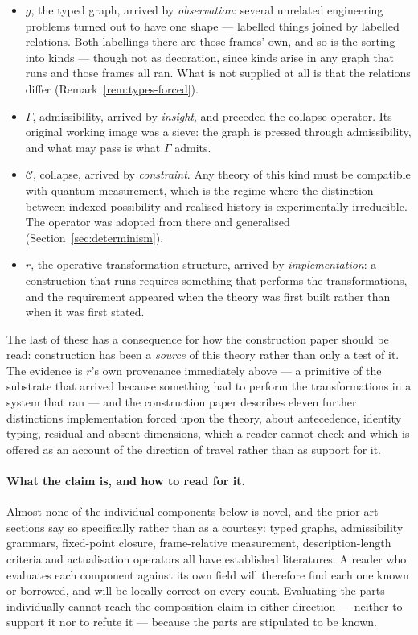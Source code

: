 \documentclass[11pt,a4paper]{article}
\theoremstyle{remark}\newtheorem{remark}[definition]{Remark}
\newcommand{\Coll}{\mathcal{C}}
\begin{document}
\begin{itemize}[leftmargin=*]
\item $g$, the typed graph, arrived by \emph{observation}: several unrelated engineering problems turned out to have one shape --- labelled things joined by labelled relations. Both labellings there are those frames' own, and so is the sorting into kinds --- though not as decoration, since kinds arise in any graph that runs and those frames all ran. What is not supplied at all is that the relations differ (Remark~\ref{rem:types-forced}).
\item $\Gamma$, admissibility, arrived by \emph{insight}, and preceded the collapse operator. Its original working image was a sieve: the graph is pressed through admissibility, and what may pass is what $\Gamma$ admits.
\item $\Coll$, collapse, arrived by \emph{constraint}. Any theory of this kind must be compatible with quantum measurement, which is the regime where the distinction between indexed possibility and realised history is experimentally irreducible. The operator was adopted from there and generalised (Section~\ref{sec:determinism}).
\item $r$, the operative transformation structure, arrived by \emph{implementation}: a construction that runs requires something that performs the transformations, and the requirement appeared when the theory was first built rather than when it was first stated.
\end{itemize}

The last of these has a consequence for how the construction paper should be read: construction has been a \emph{source} of this theory rather than only a test of it. The evidence is $r$'s own provenance immediately above --- a primitive of the substrate that arrived because something had to perform the transformations in a system that ran --- and the construction paper describes eleven further distinctions implementation forced upon the theory, about antecedence, identity typing, residual and absent dimensions, which a reader cannot check and which is offered as an account of the direction of travel rather than as support for it.

\paragraph{What the claim is, and how to read for it.}
Almost none of the individual components below is novel, and the prior-art sections say so specifically rather than as a courtesy: typed graphs, admissibility grammars, fixed-point closure, frame-relative measurement, description-length criteria and actualisation operators all have established literatures. A reader who evaluates each component against its own field will therefore find each one known or borrowed, and will be locally correct on every count. Evaluating the parts individually cannot reach the composition claim in either direction --- neither to support it nor to refute it --- because the parts are stipulated to be known.
\end{document}
